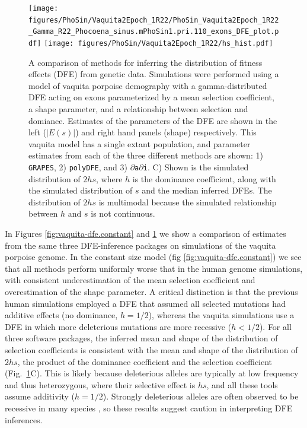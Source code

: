 \documentclass[hidelinks]{article}
\newcommand{\polydfe}{\texttt{polyDFE}\xspace}
\newcommand{\dadi}{$\partial$\texttt{a}$\partial$\texttt{i}\xspace}
\newcommand{\grapes}{\texttt{GRAPES}\xspace}
\begin{document}
    \begin{figure}
        \centering
        \texttt{[image: figures/PhoSin/Vaquita2Epoch\_1R22/PhoSin\_Vaquita2Epoch\_1R22\_Gamma\_R22\_Phocoena\_sinus.mPhoSin1.pri.110\_exons\_DFE\_plot.pdf]}
\texttt{[image: figures/PhoSin/Vaquita2Epoch\_1R22/hs\_hist.pdf]}
        \caption{
        \label{fig:vaquita-dfe}
        A comparison of methods for inferring the distribution of fitness effects (DFE) from genetic data.
        Simulations were performed using a model of vaquita porpoise demography \citep{robinson2022critically} with a gamma-distributed DFE
        acting on exons parameterized by a mean selection coefficient, a shape parameter, and a relationship between selection and domiance. Estimates of the 
        parameters of the DFE are shown in the left ($\lvert E(s) \rvert $) and right hand panels (shape) respectively.
        This vaquita model has a single extant population, and parameter estimates from each
        of the three different methods are shown: 1) \grapes \cite{galtier2016adaptive}, 2) \polydfe \citep{tataru2020polydfe},
        and 3) \dadi \citep{gutenkunst2009inferring,kim2017inference}.
        C) Shown is the simulated distribution of $2 h s$, where $h$ is the dominance coefficient, along with the simulated distribution of $s$ and the median inferred DFEs. The distribution of $2 h s$ is multimodal because the simulated relationship between $h$ and $s$ is not continuous.
        }
    \end{figure}
    
    In Figures \ref{fig:vaquita-dfe.constant} and \ref{fig:vaquita-dfe} we show a comparison of estimates
    from the same three DFE-inference packages on simulations of the
    vaquita porpoise genome. In the constant size model (fig \ref{fig:vaquita-dfe.constant}) we see that all methods
    perform uniformly worse that in the human genome simulations, with consistent underestimation of the mean selection coefficient    
    and overestimation of the shape parameter. 
    A critical distinction is that the previous human simulations employed a DFE that assumed all selected mutations had additive effects
    (no dominance, $h = 1/2$), whereas the vaquita simulations use a DFE in which more deleterious mutations are more recessive ($h < 1/2$).
    For all three software packages, the inferred mean and shape of the distribution of selection coefficients 
    is consistent with the mean and shape of the distribution of $2 h s$, the product of the dominance coefficient
    and the selection coefficient (Fig.~\ref{fig:vaquita-dfe}C).
    This is likely because deleterious alleles are typically at low frequency and thus heterozygous, 
    where their selective effect is $h s$, and all these tools assume additivity  ($h = 1/2$).
    Strongly deleterious alleles are often observed to be recessive in many species \citep{mukai1972mutation},
    so these results suggest caution in interpreting DFE inferences.
\end{document}
